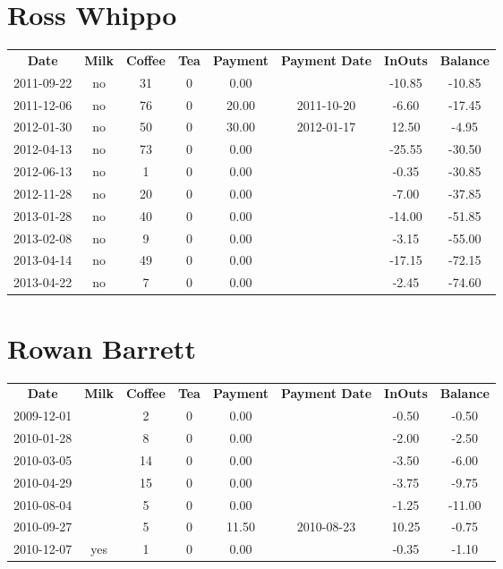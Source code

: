 \section{Ross Whippo}

\begin{center}
\begin{tabular}{cccccccc}
\textbf{Date} & \textbf{Milk} & \textbf{Coffee} & \textbf{Tea} & \textbf{Payment} & \textbf{Payment Date} & \textbf{InOuts} & \textbf{Balance} \\
2011-09-22 & no & 31 & 0 &  0.00 &  & -10.85 & -10.85\\ 
2011-12-06 & no & 76 & 0 & 20.00 & 2011-10-20 &  -6.60 & -17.45\\ 
2012-01-30 & no & 50 & 0 & 30.00 & 2012-01-17 &  12.50 &  -4.95\\ 
2012-04-13 & no & 73 & 0 &  0.00 &  & -25.55 & -30.50\\ 
2012-06-13 & no &  1 & 0 &  0.00 &  &  -0.35 & -30.85\\ 
2012-11-28 & no & 20 & 0 &  0.00 &  &  -7.00 & -37.85\\ 
2013-01-28 & no & 40 & 0 &  0.00 &  & -14.00 & -51.85\\ 
2013-02-08 & no &  9 & 0 &  0.00 &  &  -3.15 & -55.00\\ 
2013-04-14 & no & 49 & 0 &  0.00 &  & -17.15 & -72.15\\ 
2013-04-22 & no &  7 & 0 &  0.00 &  &  -2.45 & -74.60
\end{tabular}
\end{center}

\section{Rowan Barrett}

\begin{center}
\begin{tabular}{cccccccc}
\textbf{Date} & \textbf{Milk} & \textbf{Coffee} & \textbf{Tea} & \textbf{Payment} & \textbf{Payment Date} & \textbf{InOuts} & \textbf{Balance} \\
2009-12-01 &  &  2 & 0 &  0.00 &  & -0.50 &  -0.50\\ 
2010-01-28 &  &  8 & 0 &  0.00 &  & -2.00 &  -2.50\\ 
2010-03-05 &  & 14 & 0 &  0.00 &  & -3.50 &  -6.00\\ 
2010-04-29 &  & 15 & 0 &  0.00 &  & -3.75 &  -9.75\\ 
2010-08-04 &  &  5 & 0 &  0.00 &  & -1.25 & -11.00\\ 
2010-09-27 &  &  5 & 0 & 11.50 & 2010-08-23 & 10.25 &  -0.75\\ 
2010-12-07 & yes &  1 & 0 &  0.00 &  & -0.35 &  -1.10
\end{tabular}
\end{center}

